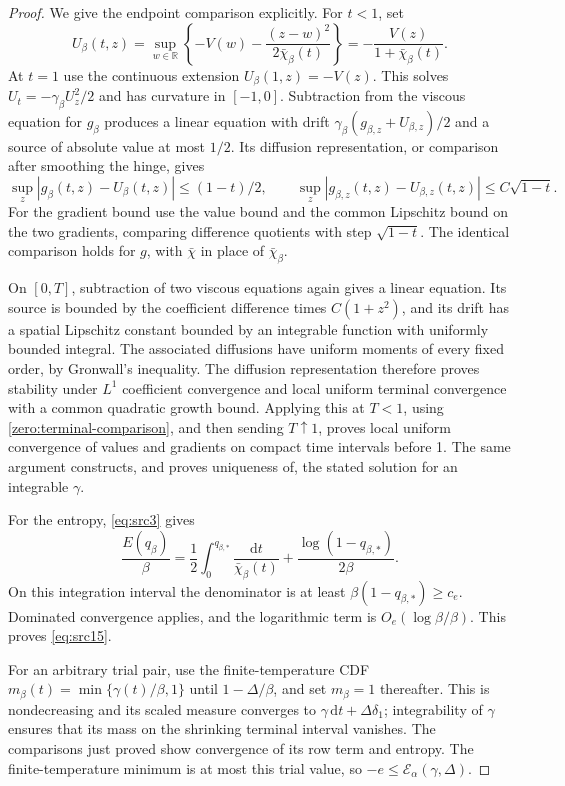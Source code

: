 \documentclass[11pt,a4paper]{article}
\numberwithin{equation}{section}
\theoremstyle{definition}
\theoremstyle{remark}
\newcommand{\R}{\mathbb R}
\newcommand{\dd}{\mathrm d}
\begin{document}
\begin{proof}
We give the endpoint comparison explicitly.  For $t<1$, set
\[
 U_\beta(t,z)=\sup_{w\in\R}
 \left\{-V(w)-\frac{(z-w)^2}{2\bar\chi_\beta(t)}\right\}
 =-\frac{V(z)}{1+\bar\chi_\beta(t)}.
\]
At $t=1$ use the continuous extension $U_\beta(1,z)=-V(z)$.
This solves \(U_t=-\gamma_\beta U_z^2/2\) and has curvature in
\([-1,0]\).  Subtraction from the viscous equation for \(g_\beta\)
produces a linear equation with drift
\(\gamma_\beta(g_{\beta,z}+U_{\beta,z})/2\) and a source of absolute
value at most \(1/2\).  Its diffusion representation, or comparison
after smoothing the hinge, gives
\begin{equation}\label{zero:terminal-comparison}
 \sup_z|g_\beta(t,z)-U_\beta(t,z)|\le(1-t)/2,
 \qquad
 \sup_z|g_{\beta,z}(t,z)-U_{\beta,z}(t,z)|\le C\sqrt{1-t}.
\end{equation}
For the gradient bound use the value bound and the common Lipschitz
bound on the two gradients, comparing difference quotients with
step \(\sqrt{1-t}\).  The identical comparison holds for \(g\), with
\(\bar\chi\) in place of \(\bar\chi_\beta\).

On \([0,T]\), subtraction of two viscous equations again gives a
linear equation.  Its source is bounded by the coefficient difference
times \(C(1+z^2)\), and its drift has a spatial Lipschitz constant
bounded by an integrable function with uniformly bounded integral.
The associated diffusions have uniform moments of every fixed order,
by Gronwall's inequality.  The diffusion representation therefore
proves stability under \(L^1\) coefficient convergence and local
uniform terminal convergence with a common quadratic growth bound.
Applying this at \(T<1\), using \eqref{zero:terminal-comparison}, and
then sending \(T\uparrow1\), proves local uniform convergence of
values and gradients on compact time intervals before 1.  The same
argument constructs, and proves uniqueness of, the stated solution
for an integrable \(\gamma\).

For the entropy, \eqref{eq:src3} gives
\[
 \frac{E(q_\beta)}\beta
 =\frac12\int_0^{q_{\beta,*}}\frac{\dd t}{\bar\chi_\beta(t)}
   +\frac{\log(1-q_{\beta,*})}{2\beta}.
\]
On this integration interval the denominator is at least
\(\beta(1-q_{\beta,*})\ge c_e\).  Dominated convergence applies,
and the logarithmic term is \(O_e(\log\beta/\beta)\).  This proves
\eqref{eq:src15}.

For an arbitrary trial pair, use the finite-temperature CDF
\(m_\beta(t)=\min\{\gamma(t)/\beta,1\}\) until
\(1-\Delta/\beta\), and set \(m_\beta=1\) thereafter.
This is nondecreasing and its scaled measure converges to
\(\gamma\,\dd t+\Delta\delta_1\); integrability of \(\gamma\)
ensures that its mass on the shrinking terminal interval vanishes.
The comparisons just proved show convergence of its row term and
entropy.  The finite-temperature minimum is at most this trial value,
so \(-e\le\mathcal E_\alpha(\gamma,\Delta)\).
\end{proof}
\end{document}

